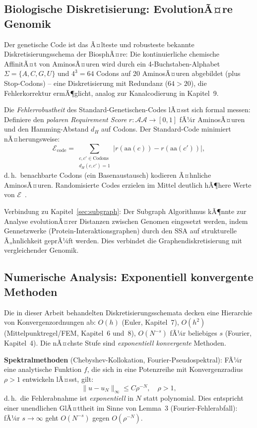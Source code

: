 ﻿\documentclass[a4paper,12pt]{article}
\theoremstyle{definition}
\begin{document}
\subsection{Biologische Diskretisierung: EvolutionÃ¤re Genomik}
\label{subsec:genomik}

Der genetische Code ist das Ã¤lteste und robusteste bekannte Diskretisierungsschema der
BiosphÃ¤re: Die kontinuierliche chemische AffinitÃ¤t von AminosÃ¤uren wird durch ein
4-Buchstaben-Alphabet $\Sigma = \{A, C, G, U\}$ und $4^3 = 64$ Codons auf 20 AminosÃ¤uren
abgebildet (plus Stop-Codons) -- eine Diskretisierung mit Redundanz ($64 > 20$), die
Fehlerkorrektur ermÃ¶glicht, analog zur Kanalcodierung in Kapitel~9.

Die \emph{Fehlerrobustheit} des Standard-Genetischen-Codes lÃ¤sst sich formal messen:
Definiere den \emph{polaren Requirement Score} $r : \mathcal{AA} \to [0,1]$ fÃ¼r
AminosÃ¤uren und den Hamming-Abstand $d_H$ auf Codons. Der Standard-Code minimiert
nÃ¤herungsweise:
\[
\mathcal{E}_{\mathrm{code}} = \sum_{\substack{c, c' \in \text{Codons} \\ d_H(c,c')=1}} |r(\mathrm{aa}(c)) - r(\mathrm{aa}(c'))|,
\]
d.\,h.\ benachbarte Codons (ein Basenaustausch) kodieren Ã¤hnliche AminosÃ¤uren. Randomisierte
Codes erzielen im Mittel deutlich hÃ¶here Werte von $\mathcal{E}$~\cite{freeland1998}.

Verbindung zu Kapitel~\ref{sec:subgraph}: Der Subgraph Algorithmus kÃ¶nnte zur
Analyse evolutionÃ¤rer Distanzen zwischen Genomen eingesetzt werden, indem
Gennetzwerke (Protein-Interaktionsgraphen) durch den SSA auf strukturelle Ã„hnlichkeit
geprÃ¼ft werden. Dies verbindet die Graphendiskretisierung mit vergleichender Genomik.

\subsection{Numerische Analysis: Exponentiell konvergente Methoden}

Die in dieser Arbeit behandelten Diskretisierungsschemata decken eine Hierarchie von
Konvergenzordnungen ab: $O(h)$ (Euler, Kapitel~7), $O(h^2)$ (Mittelpunktregel/FEM,
Kapitel~6 und~8), $O(N^{-s})$ fÃ¼r beliebiges $s$ (Fourier, Kapitel~4). Die nÃ¤chste Stufe
sind \emph{exponentiell konvergente} Methoden.

\textbf{Spektralmethoden} (Chebyshev-Kollokation, Fourier-Pseudospektral): FÃ¼r eine
analytische Funktion $f$, die sich in eine Potenzreihe mit Konvergenzradius $\rho > 1$
entwickeln lÃ¤sst, gilt:
\[
\|u - u_N\|_\infty \leq C \rho^{-N}, \quad \rho > 1,
\]
d.\,h.\ die Fehlerabnahme ist \emph{exponentiell} in $N$ statt polynomial. Dies entspricht
einer unendlichen GlÃ¤ttheit im Sinne von Lemma~3 (Fourier-Fehlerabfall): fÃ¼r $s \to \infty$
geht $O(N^{-s})$ gegen $O(\rho^{-N})$.
\end{document}

